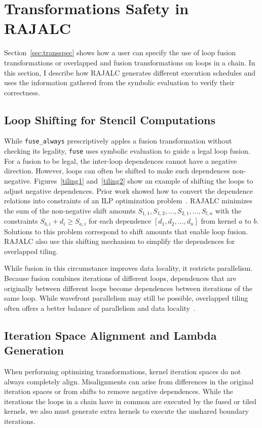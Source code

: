 \section{Transformations Safety in RAJALC}
Section~\ref{sec:transspec} shows how a user can specify the use of loop fusion transformations
or overlapped and fusion transformations on loops in a chain.
In this section, I describe 
how RAJALC generates different execution schedules and uses the information gathered from the symbolic evaluation to verify their correctness.

\subsection{Loop Shifting for Stencil Computations}

While \verb.fuse_always. prescriptively apples a fusion transformation
without checking its legality, \verb.fuse. uses symbolic evaluation to
guide a legal loop fusion.
For a fusion to be legal, the inter-loop dependences cannot have a
negative direction.
However, loops can often be shifted to make such
dependences non-negative.
Figures~\ref{tiling1} and~\ref{tiling2} show an example of shifting the
loops to adjust negative dependences.
Prior work showed how to convert the dependence relations into constraints
of an ILP optimization problem~\cite{bertolacci2019using}.
RAJALC minimizes the sum of the non-negative shift amounts
$S_{1,1},S_{1,2},\ldots,S_{2,1},\ldots,S_{l,n}$ with the constraints $S_{b,i} + d_i \geq S_{a,i}$ for each dependence
$[d_1,d_2,\ldots,d_n]$ from kernel $a$ to $b$.
Solutions to this problem correspond to shift amounts that enable loop fusion.
RAJALC also use this shifting mechanism to simplify the dependences for overlapped
tiling.

While fusion in this circumstance improves data locality, it restricts
parallelism.
Because fusion combines iterations of different loops, dependences that
are originally between different loops become dependences between iterations
of the same loop. 
While wavefront parallelism may still be possible, overlapped tiling often
offers a better balance of parallelism and data locality~\cite{CathieSC14}.

\subsection{Iteration Space Alignment and Lambda Generation}
When performing optimizing transformations, kernel iteration spaces do not
always completely align. 
Misalignments can arise from differences in the original iteration spaces
or from shifts to remove negative dependences. 
While the iterations the loops in a chain have in common are executed by
the fused or tiled kernels, we also must generate extra kernels to execute
the unshared boundary iterations.

